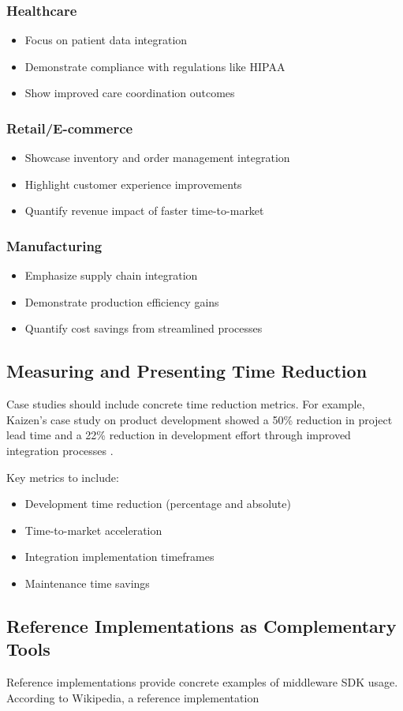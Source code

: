 \documentclass[11pt,a4paper]{article}
\begin{document}
\subsubsection{Healthcare}
\begin{itemize}
    \item Focus on patient data integration
    \item Demonstrate compliance with regulations like HIPAA
    \item Show improved care coordination outcomes
\end{itemize}

\subsubsection{Retail/E-commerce}
\begin{itemize}
    \item Showcase inventory and order management integration
    \item Highlight customer experience improvements
    \item Quantify revenue impact of faster time-to-market
\end{itemize}

\subsubsection{Manufacturing}
\begin{itemize}
    \item Emphasize supply chain integration
    \item Demonstrate production efficiency gains
    \item Quantify cost savings from streamlined processes
\end{itemize}

\subsection{Measuring and Presenting Time Reduction}

Case studies should include concrete time reduction metrics. For example, Kaizen's case study on product development showed a 50\% reduction in project lead time and a 22\% reduction in development effort through improved integration processes \citep{KaizenInstitute2021LeadTime}.

Key metrics to include:
\begin{itemize}
    \item Development time reduction (percentage and absolute)
    \item Time-to-market acceleration
    \item Integration implementation timeframes
    \item Maintenance time savings
\end{itemize}

\subsection{Reference Implementations as Complementary Tools}

Reference implementations provide concrete examples of middleware SDK usage. According to Wikipedia, a reference implementation
\end{document}
